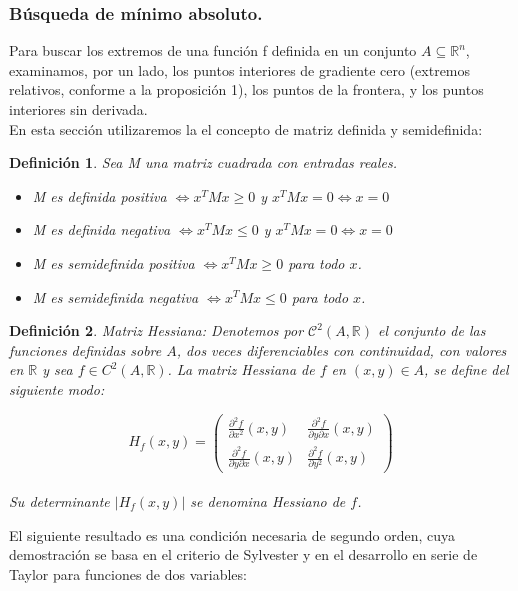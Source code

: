 \documentclass[a4paper,10pt]{article}
\newtheorem{definition}{Definición}
\begin{document}
\subsubsection{Búsqueda de mínimo absoluto.}
Para buscar los extremos de una función f definida en un conjunto $A\subseteq \mathbb{R}^n$, examinamos, por un lado, los
puntos interiores de gradiente cero (extremos relativos, conforme a la proposición
1), los puntos de la frontera, y los puntos interiores sin derivada. 
\\En esta sección utilizaremos la el concepto de matriz definida y semidefinida:
\begin{definition}Sea M una matriz cuadrada con entradas reales.
\begin{itemize}
\item M es definida positiva $\Longleftrightarrow x^TMx \geq 0$ y $x^TMx=0\Leftrightarrow x=0$
\item M es definida negativa  $\Longleftrightarrow x^TMx \leq0$ y $x^TMx=0\Leftrightarrow x=0$
\item M es semidefinida positiva  $\Longleftrightarrow x^TMx \geq0$ para todo $x$.
\item M es semidefinida negativa  $\Longleftrightarrow x^TMx \leq0$  para todo $x$.
\end{itemize}
\end{definition}
\begin{definition}
Matriz Hessiana:  Denotemos por $\mathcal{C}^2(A,\mathbb{R})$  el conjunto de las funciones definidas
sobre $A$, dos veces diferenciables con continuidad, con valores en $\mathbb{R}$ y sea $f \in
C^2(A, \mathbb{R})$. La matriz Hessiana de $f$ en $(x, y) \in A$, se define del siguiente modo:

$$
H_f(x,y)=\left(
\begin{array}{cc}
\frac{\partial^2f}{\partial x^2}(x,y) & \frac{\partial^2f}{\partial y\partial x}(x,y) \\
\frac{\partial^2f}{\partial y\partial x}(x,y) & \frac{\partial^2f}{\partial y^2}(x,y)
\end{array}
\right)
$$
\\
Su determinante $|H_f(x,y)|$ se denomina Hessiano de $f$.
\end{definition}
El siguiente resultado es una condición necesaria de segundo orden, cuya demostración se basa en el criterio de Sylvester y en el desarrollo en serie de Taylor
para funciones de dos variables:
\end{document}

